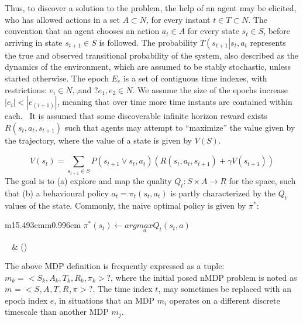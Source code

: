 \documentclass{article}
\makeatletter
\newcommand\arraybslash{\let\\\@arraycr}
\newcounter{Equation}
\renewcommand\theEquation{\arabic{Equation}}
\makeatother
\begin{document}
Thus, to discover a solution to the problem, the help of an agent may be elicited, who has allowed actions in a set  $A{\subset}N$, for every instant  $t{\in}T{\subset}N$. The convention that an agent chooses an action  $a_t{\in}A$ for every state  $s_t{\in}S$, before arriving in state  $s_{t+1}{\in}S$ is followed. The probability  $T\left(s_{t+1}\right|s_t,a_t$ represents the true and observed transitional probability of the system, also described as the dynamics of the environment, which are assumed to be stably stochastic, unless started otherwise. The epoch  $E_e$ is a set of contiguous time indexes, with restrictions:  $e_i{\in}N,$,and  $?e_1,e_2{\in}N$. We assume the size of the epochs increase  $\left|e_i\right|<\left|e_{(i+1)}\right|$, meaning that over time more time instants are contained within each. \ It is assumed that some discoverable infinite horizon reward exists  $R\left(s_t,a_t,s_{t+1}\right)$ such that agents may attempt to ``maximize'' the value given by the trajectory, where the value of a state is given by  $V\left(S\right).$

\begin{equation}
V\left(s_t\right)=\sum _{s_{t+1}{\in}S}^{}P\left(s_{t+1}\vee s_t,a_t\right)\left(R\left(s_t,a_t,s_{t+1}\right)+\mathit{\gamma V}\left(s_{t+1}\right)\right)
\end{equation}
The goal is to (a) explore and map the quality  $Q_t:S\times A\rightarrow R$ for the space, such that (b) a behavioural policy  $a_t=\pi _t(s_t,a_t)$ is partly characterized by the  $Q_t$ values of the state. Commonly, the naive optimal policy is given by  $\pi _{}^{\ast }$:

\begin{flushleft}
\tablefirsthead{}
\tablehead{}
\tabletail{}
\tablelasttail{}
\begin{supertabular}{m{15.493cm}m{0.996cm}}
 $\pi _{}^{\ast }\left(s_t\right)\leftarrow \mathit{arg}\underset a{\mathit{max}}Q_t(s_t,a)$

~
 &
\centering\arraybslash (\stepcounter{Equation}{\theEquation})\\
\end{supertabular}
\end{flushleft}
The above MDP definition is frequently expressed as a tuple: \  $m_k=<S_k,A_k,T_k,R_k,\pi _k>?$, where the initial posed nMDP problem is noted as  $m_{}=<S_{},A_{},T_{},R_{},\pi _{}>?$. The time index  $t$, may sometimes be replaced with an epoch index  $e$, in situations that an MDP  $m_i$ operates on a different discrete timescale than another MDP  $m_j$.
\end{document}
